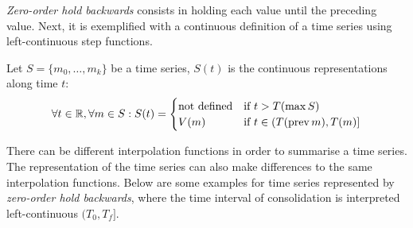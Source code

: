\emph{Zero-order hold backwards} consists in holding each value until
the preceding value. Next, it is exemplified with a continuous
definition of a time series using left-continuous step functions.

\begin{definition}
  Let $S=\{m_0,\ldots,m_k\}$ be a time series, $S(t)$ is the
  continuous representations along time $t$:
\[
\forall t \in \mathbb{R}  ,\forall m \in S:
S(t) =  
\begin{cases}
  \text{not defined} & \text{if } t > T(\max S) \\
  V(m) & \text{if }  t\in (T(\operatorname*{prev} m),T(m)]
\end{cases}
\]
\end{definition}


There can be different interpolation functions in order to summarise a
time series. The representation of the time series can also make
differences to the same interpolation functions. Below are some
examples for time series represented by \emph{zero-order hold
  backwards}, where the time interval of consolidation is interpreted
left-continuous $(T_0,T_f]$.



